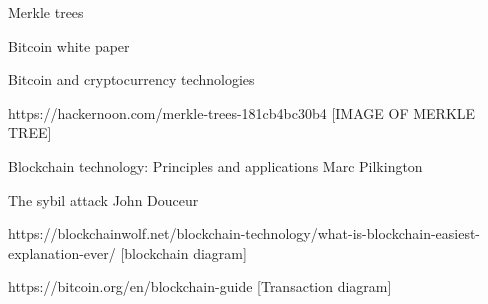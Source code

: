 \documentclass{l4proj}
\begin{document}





Merkle trees

Bitcoin white paper

Bitcoin and cryptocurrency technologies

https://hackernoon.com/merkle-trees-181cb4bc30b4
[IMAGE OF MERKLE TREE] 

Blockchain technology: Principles and applications Marc Pilkington

The sybil attack John Douceur

https://blockchainwolf.net/blockchain-technology/what-is-blockchain-easiest-explanation-ever/ [blockchain diagram]

https://bitcoin.org/en/blockchain-guide [Transaction diagram]
\end{document}
